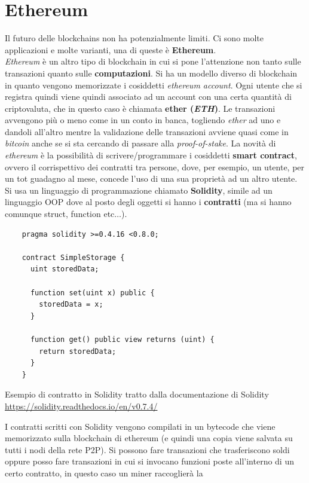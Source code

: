 \documentclass[a4paper,12pt, oneside]{book}
\begin{document}
\section{Ethereum}
Il futuro delle blockchains non ha potenzialmente limiti. Ci sono molte
applicazioni e molte varianti, una di queste è \textbf{Ethereum}.\\
\textit{Ethereum} è un altro tipo di blockchain in cui si pone l'attenzione non
tanto sulle transazioni quanto sulle \textbf{computazioni}. Si ha un modello
diverso di blockchain in quanto vengono memorizzate i cosiddetti
\textit{ethereum account}. Ogni utente che si registra quindi viene quindi
associato ad un account con una certa quantità di criptovaluta, che in questo
caso è chiamata \textbf{ether (\textit{ETH})}. Le transazioni avvengono più o
meno come in un conto in banca, togliendo \textit{ether} ad uno e dandoli
all'altro mentre la validazione delle transazioni avviene quasi come in
\textit{bitcoin} anche se si sta cercando di passare alla
\textit{proof-of-stake}. La novità di \textit{ethereum} è la possibilità di
scrivere/programmare i cosiddetti \textbf{smart contract}, ovvero il
corrispettivo dei contratti tra persone, dove, per esempio, un utente, per un
tot guadagno al mese, concede l'uso di una sua proprietà ad un altro
utente. Si usa un linguaggio di programmazione chiamato \textbf{Solidity},
simile ad un linguaggio OOP dove al posto degli oggetti si hanno i
\textbf{contratti} (ma si hanno comunque \textup{struct, function} etc$\ldots$).
\begin{listing}
  \begin{verbatim}
    pragma solidity >=0.4.16 <0.8.0;

    contract SimpleStorage {
      uint storedData;

      function set(uint x) public {
        storedData = x;
      }

      function get() public view returns (uint) {
        return storedData;
      }
    }
  \end{verbatim}
  \caption{Esempio di contratto in Solidity tratto dalla documentazione di
    Solidity \url{https://solidity.readthedocs.io/en/v0.7.4/}}
\end{listing}
I contratti scritti con Solidity vengono compilati in un bytecode che viene
memorizzato sulla blockchain di ethereum (e quindi una copia viene salvata su
tutti i nodi della rete P2P). Si possono fare transazioni che trasferiscono
soldi oppure posso fare transazioni in cui si invocano funzioni poste
all'interno di un certo contratto, in questo caso un miner raccoglierà la
\end{document}
